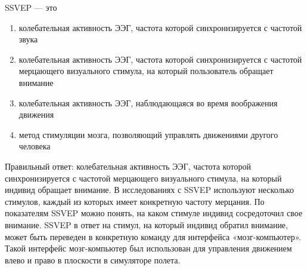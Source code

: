 
SSVEP — это

\begin{enumerate}
    \item колебательная активность ЭЭГ, частота которой синхронизируется с частотой звука
    \item колебательная активность ЭЭГ, частота которой синхронизируется с частотой мерцающего визуального стимула, на который пользователь обращает внимание
    \item колебательная активность ЭЭГ, наблюдающаяся во время воображения движения
    \item метод стимуляции мозга, позволяющий управлять движениями другого человека
\end{enumerate}

\explanationSection

Правильный ответ: колебательная активность ЭЭГ, частота которой синхронизируется с частотой мерцающего визуального стимула, на который индивид обращает внимание. В исследованиях с SSVEP используют несколько стимулов, каждый из которых имеет конкретную частоту мерцания. По показателям SSVEP можно понять, на каком стимуле индивид сосредоточил свое внимание. SSVEP в ответ на стимул, на который индивид обратил внимание, может быть переведен в конкретную команду для интерфейса «мозг-компьютер». Такой интерфейс мозг-компьютер был использован для управления движением влево и право в плоскости в симуляторе полета.

